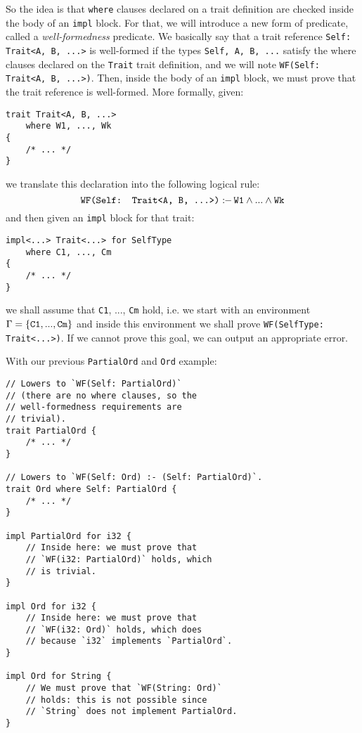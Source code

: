 \documentclass[twocolumn]{article}
\newcommand{\rust}[1]{\texttt{#1}}
\newcommand{\mrust}[1]{\text{\rust{#1}}}
\newcommand{\pif}[0]{:\!\!-\,}
\begin{document}
So the idea is that \rust{where} clauses declared on a trait definition are checked inside the body of an \rust{impl} block. For that, we will introduce a new form of predicate, called a \textit{well-formedness} predicate. We basically say that a trait reference \rust{Self: Trait<A, B, ...>} is well-formed if the types \rust{Self, A, B, ...} satisfy the where clauses declared on the \rust{Trait} trait definition, and we will note \rust{WF(Self: Trait<A, B, ...>)}. Then, inside the body of an \rust{impl} block, we must prove that the trait reference is well-formed. More formally, given:
\begin{verbatim}
trait Trait<A, B, ...>
    where W1, ..., Wk
{
    /* ... */
}
\end{verbatim}
we translate this declaration into the following logical rule:
\[
    \mrust{WF(Self: Trait<A, B, ...>)} \pif \mrust{W1} \land ... \land \mrust{Wk}
\]
and then given an \rust{impl} block for that trait:
\begin{verbatim}
impl<...> Trait<...> for SelfType
    where C1, ..., Cm
{
    /* ... */
}
\end{verbatim}
we shall assume that \rust{C1}, ..., \rust{Cm} hold, i.e. we start with an environment $\Gamma = \{ \mrust{C1}, ..., \mrust{Cm} \}$ and inside this environment we shall prove \rust{WF(SelfType: Trait<...>)}. If we cannot prove this goal, we can output an appropriate error.

With our previous \rust{PartialOrd} and \rust{Ord} example:
\begin{verbatim}
// Lowers to `WF(Self: PartialOrd)`
// (there are no where clauses, so the
// well-formedness requirements are
// trivial).
trait PartialOrd {
    /* ... */
}

// Lowers to `WF(Self: Ord) :- (Self: PartialOrd)`.
trait Ord where Self: PartialOrd {
    /* ... */
}

impl PartialOrd for i32 {
    // Inside here: we must prove that
    // `WF(i32: PartialOrd)` holds, which
    // is trivial.
}

impl Ord for i32 {
    // Inside here: we must prove that
    // `WF(i32: Ord)` holds, which does
    // because `i32` implements `PartialOrd`.
}

impl Ord for String {
    // We must prove that `WF(String: Ord)`
    // holds: this is not possible since
    // `String` does not implement PartialOrd.
}
\end{verbatim}
\end{document}
